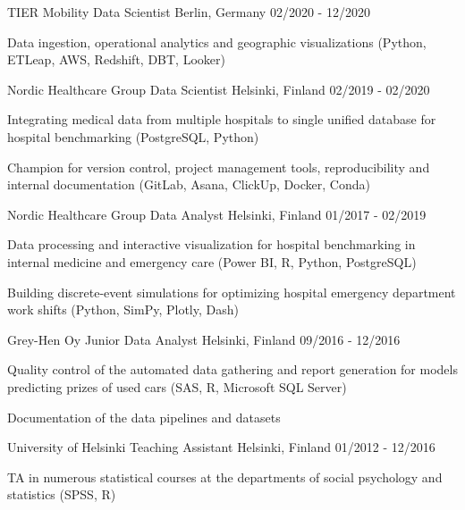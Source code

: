 \begin{cventries}
  \cventry
    {TIER Mobility} %
    {Data Scientist} %
    {Berlin, Germany} %
    {02/2020 - 12/2020} %
    {
      \begin{cvitems}
        \item {Data ingestion, operational analytics and geographic
        visualizations (Python, ETLeap, AWS, Redshift, DBT, Looker)}
      \end{cvitems}
    }

  \cventry
    {Nordic Healthcare Group} %
    {Data Scientist} %
    {Helsinki, Finland} %
    {02/2019 - 02/2020} %
    {
      \begin{cvitems}
        \item {Integrating medical data from multiple hospitals to single unified database for hospital benchmarking
        (PostgreSQL, Python)}
        \item {Champion for version control, project management tools,
        reproducibility and internal documentation (GitLab, Asana, ClickUp, Docker, Conda)}
      \end{cvitems}
    }

  \cventry
    {Nordic Healthcare Group} %
    {Data Analyst} %
    {Helsinki, Finland} %
    {01/2017 - 02/2019} %
    {
      \begin{cvitems}
        \item {Data processing and interactive visualization for hospital benchmarking
        in internal medicine and emergency care (Power BI, R, Python, PostgreSQL)}
        \item {Building discrete-event simulations for optimizing hospital emergency department work shifts (Python, SimPy, Plotly, Dash)}
      \end{cvitems}
    }

  \cventry
    {Grey-Hen Oy} %
    {Junior Data Analyst} %
    {Helsinki, Finland} %
    {09/2016 - 12/2016} %
    {
      \begin{cvitems}
        \item {Quality control of the automated data gathering and report generation
        for models predicting prizes of used cars (SAS, R, Microsoft SQL Server)}
        \item {Documentation of the data pipelines and datasets}
      \end{cvitems}
    }

  \cventry
    {University of Helsinki} %
    {Teaching Assistant} %
    {Helsinki, Finland} %
    {01/2012 - 12/2016} %
    {
      \begin{cvitems}
        \item {TA in numerous statistical courses at the departments of social
        psychology and statistics (SPSS, R)}
      \end{cvitems}
    }


\end{cventries}
